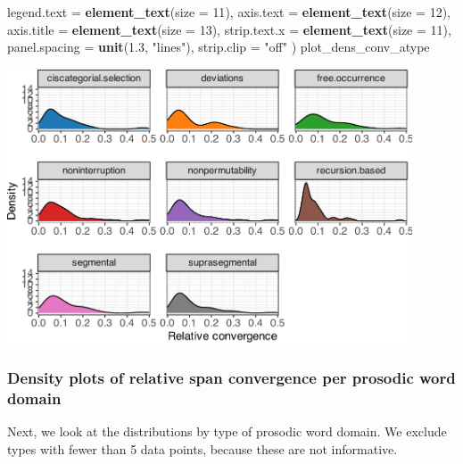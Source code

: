 \documentclass[
]{article}
\newenvironment{Shaded}{\begin{snugshade}}{\end{snugshade}}
\newcommand{\AttributeTok}[1]{\textcolor[rgb]{0.13,0.29,0.53}{#1}}
\newcommand{\DecValTok}[1]{\textcolor[rgb]{0.00,0.00,0.81}{#1}}
\newcommand{\FloatTok}[1]{\textcolor[rgb]{0.00,0.00,0.81}{#1}}
\newcommand{\FunctionTok}[1]{\textcolor[rgb]{0.13,0.29,0.53}{\textbf{#1}}}
\newcommand{\NormalTok}[1]{#1}
\newcommand{\StringTok}[1]{\textcolor[rgb]{0.31,0.60,0.02}{#1}}
\begin{document}
\begin{Shaded}
\begin{Highlighting}[]
    \AttributeTok{legend.text =} \FunctionTok{element\_text}\NormalTok{(}\AttributeTok{size =} \DecValTok{11}\NormalTok{),}
    \AttributeTok{axis.text =} \FunctionTok{element\_text}\NormalTok{(}\AttributeTok{size =} \DecValTok{12}\NormalTok{),}
    \AttributeTok{axis.title =} \FunctionTok{element\_text}\NormalTok{(}\AttributeTok{size =} \DecValTok{13}\NormalTok{),}
    \AttributeTok{strip.text.x =} \FunctionTok{element\_text}\NormalTok{(}\AttributeTok{size =} \DecValTok{11}\NormalTok{),}
    \AttributeTok{panel.spacing =} \FunctionTok{unit}\NormalTok{(}\FloatTok{1.3}\NormalTok{, }\StringTok{"lines"}\NormalTok{),}
    \AttributeTok{strip.clip =} \StringTok{"off"}
\NormalTok{  )}
\NormalTok{plot\_dens\_conv\_atype}
\end{Highlighting}
\end{Shaded}

\begin{center}\includegraphics[width=0.9\textwidth,height=\textheight]{02_analyses_chapter17_files/figure-latex/dens at-1} \end{center}

\subsubsection{Density plots of relative span convergence per prosodic
word
domain}\label{density-plots-of-relative-span-convergence-per-prosodic-word-domain}

Next, we look at the distributions by type of prosodic word domain. We
exclude types with fewer than 5 data points, because these are not
informative.
\end{document}
